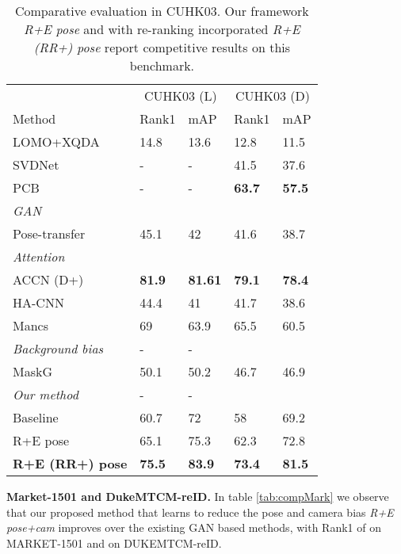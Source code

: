 \documentclass[10pt,twocolumn,letterpaper]{article}
\begin{document}
\begin{table}[h]
\begin{tabular}{lllll}
 & \multicolumn{2}{c}{CUHK03 (L)} & \multicolumn{2}{c}{CUHK03 (D)} \\
Method & Rank1 & \multicolumn{1}{l|}{mAP} & Rank1 & mAP \\ \hline
LOMO+XQDA~\cite{liao2015person} & 14.8 & \multicolumn{1}{l|}{13.6} & 12.8& 11.5\\ 
SVDNet~\cite{sun2017svdnet} & - & \multicolumn{1}{l|}{-} & 41.5& 37.6\\
PCB~\cite{sun2017beyond} & - & \multicolumn{1}{l|}{-} & \textbf{63.7} & \textbf{57.5} \\ 
\hline
\textit{GAN} &  & \multicolumn{1}{l|}{} &  &  \\
Pose-transfer~\cite{liu2018pose} & 45.1 & \multicolumn{1}{l|}{42} & 41.6 & 38.7 \\ 
\hline
\textit{Attention} &  & \multicolumn{1}{l|}{} &  &  \\
ACCN (D+)~\cite{xuattention} & \textbf{81.9} & \multicolumn{1}{l|}{\textbf{81.61}} & \textbf{79.1} & \textbf{78.4} \\
HA-CNN~\cite{li2018harmonious} & 44.4 & \multicolumn{1}{l|}{41} & 41.7 & 38.6 \\
Mancs~\cite{wang2018mancs}  & 69 & \multicolumn{1}{l|}{63.9} & 65.5 & 60.5 \\ 
\hline
\textit{Background bias} & - & \multicolumn{1}{l|}{-} &  &  \\
MaskG~\cite{song2018mask} & 50.1 & \multicolumn{1}{l|}{50.2} & 46.7 & 46.9 \\
\hline
\textit{Our method}& - & \multicolumn{1}{l|}{-} &  &  \\
Baseline  & 60.7 & \multicolumn{1}{l|}{72} & 58 & 69.2\\ R+E pose & 65.1 & \multicolumn{1}{l|}{75.3} & 62.3 & 72.8
\\ \textbf{R+E (RR+) pose}  & \textbf{75.5} & \multicolumn{1}{l|}{\textbf{83.9}} & \textbf{73.4} & \textbf{81.5}

\\ \hline
\end{tabular}
\caption{Comparative evaluation in CUHK03. Our framework \textit{R+E pose} and with re-ranking incorporated \textit{R+E (RR+) pose}  report competitive results on this benchmark.}
\label{tab:compCUHK03}
\end{table}
\noindent\textbf{Market-1501 and DukeMTCM-reID.}  In table \ref{tab:compMark} we observe that our proposed method that learns to reduce the pose and camera bias \textit{R+E pose+cam} improves over the existing GAN based methods, with Rank1 of  on MARKET-1501 and  on DUKEMTCM-reID.
\end{document}

